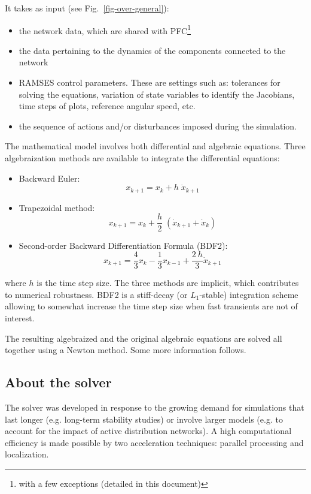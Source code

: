 It takes as input (see Fig.~\ref{fig-over-general}):
\begin{itemize}
\item the network data, which are shared with PFC\footnote{with a few exceptions (detailed in this document)}
\item the data pertaining to the dynamics of the components connected to the network
\item RAMSES control parameters. These are settings such as: tolerances for solving the equations, variation of state variables to identify the Jacobians, time steps of plots, reference angular speed, etc.
\item the sequence of actions and/or disturbances imposed during the simulation.
\end{itemize}

The mathematical model involves both differential and algebraic equations. Three algebraization methods are available to integrate the differential equations:
\begin{itemize}
\item Backward Euler:
\[ x_{k+1} = x_k + h \; \dot{x}_{k+1} \]
\item Trapezoidal method:
\[ x_{k+1} = x_k + \frac{h}{2} \; (\dot{x}_{k+1} + \dot{x}_{k}) \]
\item Second-order Backward Differentiation Formula (BDF2):
\[ x_{k+1} = \frac{4}{3} x_k - \frac{1}{3} x_{k-1} + \frac{2\: h}{3} \dot{x}_{k+1} \]
\end{itemize}
where $h$ is the time step size. The three methods are implicit, which contributes to numerical robustness. 
BDF2 is a stiff-decay (or $L_1$-stable) integration scheme allowing to somewhat increase the time step size when fast transients are not of interest.

The resulting algebraized and the original algebraic equations are solved all together using a Newton method. Some more information follows. 

\subsection{About the solver}

The solver was developed in response to the growing demand for simulations that last longer (e.g. long-term stability studies) or involve larger models (e.g. to account for the impact of active distribution networks). A high computational efficiency is made possible by two acceleration techniques: parallel processing and localization.

